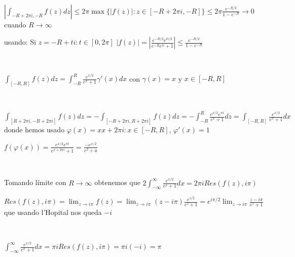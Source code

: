 \

$\left| \int_{-R+2\pi i, -R} f(z)dz \right| \leq 2\pi \max \{ |f(z)| : z\in[-R+2\pi i, -R] \} \leq 2\pi \frac{e^{-R/2}}{1-e^{-R}} \rightarrow 0$ cuando $R\rightarrow\infty$

usando:
Si $z= -R+ti : t\in[0,2\pi]$
$|f(z)| = \left| \frac{e^{-R/2}e^{ti/2}}{e^{-R}e^{ti}+1} \right| \leq \frac{e^{-R/2}}{1-e^{-R}}$

\

$\int_{[-R,R]} f(z)dz = \int_{-R}^{R} \frac{e^{x/2}}{e^x+1} \gamma'(x)dx$ con $\gamma(x)=x$ y $x\in[-R,R]$

\

$\int_{[R+2\pi i, -R+2\pi i]} f(z)dz = -\int_{[-R+2\pi i, R+2\pi i]} f(z)dz = -\int_{-R}^{R} \frac{e^{x/2}e^{\pi i}}{e^x+1}dz = \int_{[-R,R]} \frac{e^{x/2}}{e^x+1}dx$
donde hemos usado
$\varphi (x) = xx+2\pi i : x\in[-R,R]$, $\varphi'(x) = 1$

$f(\varphi(x)) = \frac{e^{x/2}e^{\pi i}}{e^{x+2\pi i}+1} = \frac{-e^{x/2}}{e^2+a}$

\

Tomando límite con $R\rightarrow\infty$ obtenemos que
$2\int_{-\infty}^{\infty} \frac{e^{x/2}}{e^x+1} dx = 2\pi iRes(f(z),i\pi)$

$Res(f(z),i\pi) = \lim_{z\rightarrow i\pi} f(z) = \lim_{z\rightarrow i\pi} (z-i\pi) \frac{e^{z/2}}{e^z+1} = e^{i\pi/2} \lim_{z\rightarrow i\pi} \frac{z-i\pi}{e^z+1}$
que usando l'Hopital nos queda
$-i$

\

$\int_{-\infty}^{\infty} \frac{e^{x/2}}{e^x+1} dx = \pi iRes(f(z),i\pi) = \pi i(-i) = \pi $

